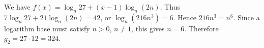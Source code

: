 We have $f(x)=\log_n27+(x-1)\log_n(2n)$. Thus $7\log_n27+21\log_n(2n)=42$, or $\log_n(216n^3)=6$. Hence $216n^3=n^6$. Since a logarithm base must satisfy $n>0$, $n\ne1$, this gives $n=6$. Therefore $g_2=27\cdot12=\boxed{324}$.
